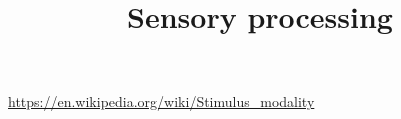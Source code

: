 \documentclass[a4paper]{article}
\title{Sensory processing}
\date{}
\begin{document}
    \maketitle

    \url{https://en.wikipedia.org/wiki/Stimulus_modality}
\end{document}

